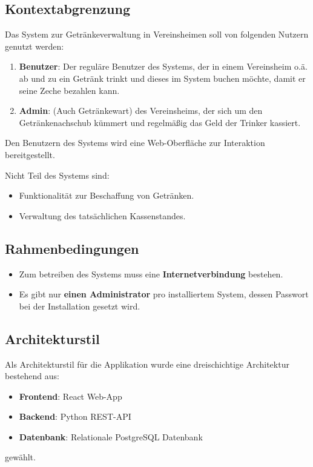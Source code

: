 \documentclass[conference,a4paper]{cs-techrep}
\begin{document}
\subsection{Kontextabgrenzung}
Das System zur Getränkeverwaltung in Vereinsheimen soll von folgenden Nutzern genutzt werden:
\begin{enumerate}
	\item \textbf{Benutzer}: 
	Der reguläre Benutzer des Systems, der in einem Vereinsheim o.ä. ab und zu ein Getränk trinkt und dieses im System buchen möchte, damit er seine Zeche bezahlen kann.
	\item \textbf{Admin}: 
	(Auch Getränkewart) des Vereinsheims, der sich um den Getränkenachschub kümmert und regelmäßig das Geld der Trinker kassiert.
\end{enumerate}
Den Benutzern des Systems wird eine Web-Oberfläche zur Interaktion bereitgestellt.\par
Nicht Teil des Systems sind: 
\begin{itemize}
	\item Funktionalität zur Beschaffung von Getränken.
	\item Verwaltung des tatsächlichen Kassenstandes.
\end{itemize}
\subsection{Rahmenbedingungen}
\begin{itemize}
	\item Zum betreiben des Systems muss eine \textbf{Internetverbindung} bestehen.
	\item Es gibt nur \textbf{einen Administrator} pro installiertem System, dessen Passwort bei der Installation gesetzt wird.
\end{itemize}
\subsection{Architekturstil}
Als Architekturstil für die Applikation wurde eine dreischichtige Architektur bestehend aus:
\begin{itemize}
	\item \textbf{Frontend}: React Web-App
	\item \textbf{Backend}: Python REST-API
	\item \textbf{Datenbank}: Relationale PostgreSQL Datenbank
\end{itemize}
gewählt.
\end{document}
